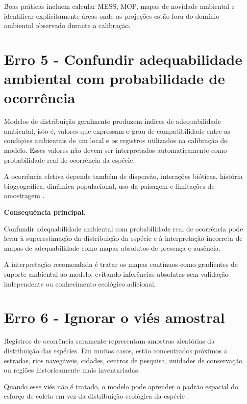 Boas práticas incluem calcular MESS, MOP, mapas de novidade ambiental e
identificar explicitamente áreas onde as projeções estão fora do domínio
ambiental observado durante a calibração.

\section{Erro 5 - Confundir adequabilidade ambiental com probabilidade de ocorrência}

Modelos de distribuição geralmente produzem índices de adequabilidade
ambiental, isto é, valores que expressam o grau de compatibilidade entre as
condições ambientais de um local e os registros utilizados na calibração do
modelo. Esses valores não devem ser interpretados automaticamente como
probabilidade real de ocorrência da espécie.

A ocorrência efetiva depende também de dispersão, interações bióticas,
história biogeográfica, dinâmica populacional, uso da paisagem e limitações de
amostragem \citep{soberon2007grinnellian, franklin2010mapping,
	peterson2011ecological}.

\begin{sdmwarningbox}
	\textbf{Consequência principal.}
	
	Confundir adequabilidade ambiental com probabilidade real de ocorrência pode
	levar à superestimação da distribuição da espécie e à interpretação incorreta
	de mapas de adequabilidade como mapas absolutos de presença e ausência.
\end{sdmwarningbox}

A interpretação recomendada é tratar os mapas contínuos como gradientes de
suporte ambiental ao modelo, evitando inferências absolutas sem validação
independente ou conhecimento ecológico adicional.

\section{Erro 6 - Ignorar o viés amostral}

Registros de ocorrência raramente representam amostras aleatórias da
distribuição das espécies. Em muitos casos, estão concentrados próximos a
estradas, rios navegáveis, cidades, centros de pesquisa, unidades de
conservação ou regiões historicamente mais inventariadas.

Quando esse viés não é tratado, o modelo pode aprender o padrão espacial do
esforço de coleta em vez da distribuição ecológica da espécie
\citep{phillips2009sample, kramer2013importance, fourcade2014mapping}.

